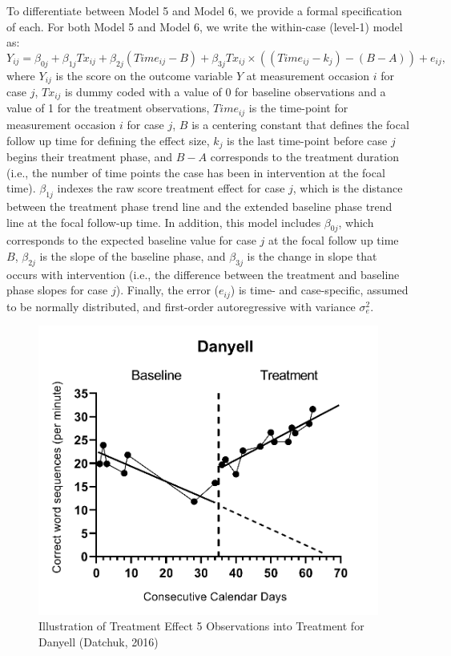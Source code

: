 \documentclass[
]{book}
\begin{document}
To differentiate between Model 5 and Model 6, we provide a formal specification of each. For both Model 5 and Model 6, we write the within-case (level-1) model as:
\begin{equation}
\label{eq:M5M6-L1}
Y_{ij} = \beta_{0j} + \beta_{1j}Tx_{ij} + \beta_{2j} (Time_{ij}-B)+ \beta_{3j}Tx_{ij}\times((Time_{ij}-k_j)-(B-A)) + e_{ij},
\end{equation}
where \(Y_{ij}\) is the score on the outcome variable \(Y\) at measurement occasion \(i\) for case \(j\), \(Tx_{ij}\) is dummy coded with a value of 0 for baseline observations and a value of 1 for the treatment observations, \(Time_{ij}\) is the time-point for measurement occasion \(i\) for case \(j\), \(B\) is a centering constant that defines the focal follow up time for defining the effect size, \(k_j\) is the last time-point before case \(j\) begins their treatment phase, and \(B-A\) corresponds to the treatment duration (i.e., the number of time points the case has been in intervention at the focal time). \(\beta_{1j}\) indexes the raw score treatment effect for case \(j\), which is the distance between the treatment phase trend line and the extended baseline phase trend line at the focal follow-up time. In addition, this model includes \(\beta_{0j}\), which corresponds to the expected baseline value for case \(j\) at the focal follow up time \(B\), \(\beta_{2j}\) is the slope of the baseline phase, and \(\beta_{3j}\) is the change in slope that occurs with intervention (i.e., the difference between the treatment and baseline phase slopes for case \(j\)). Finally, the error (\(e_{ij}\)) is time- and case-specific, assumed to be normally distributed, and first-order autoregressive with variance \(\sigma_e^2\).

\begin{figure}
\includegraphics[width=0.75\linewidth,height=0.75\textheight]{images/Datchuk2016_Danyell} \caption{Illustration of Treatment Effect 5 Observations into Treatment for Danyell (Datchuk, 2016)}\label{fig:Datchuk-2016-Danyell}
\end{figure}
\end{document}
